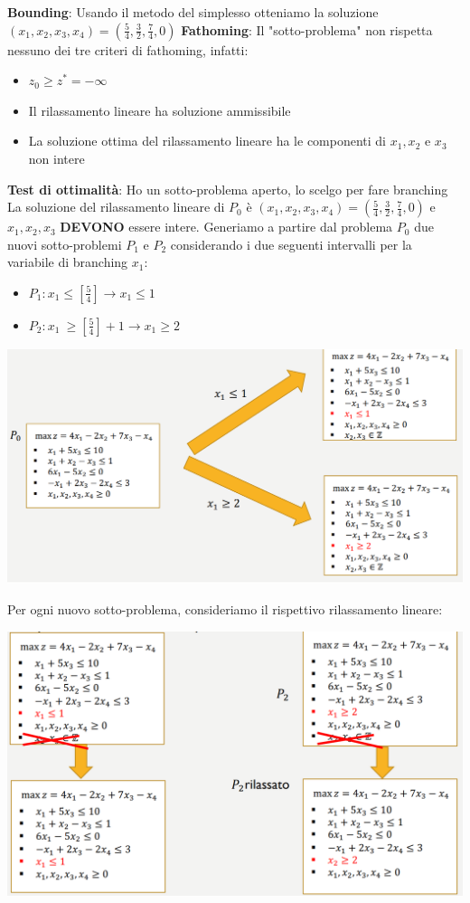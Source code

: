 \documentclass[12pt]{article}
\begin{document}
\textbf{Bounding}: Usando il metodo del simplesso otteniamo la soluzione $(x_1,x_2,x_3,x_4) = (\frac{5}{4}, \frac{3}{2}, \frac{7}{4}, 0)$ \newline
\textbf{Fathoming}: Il "sotto-problema" non rispetta nessuno dei tre criteri di fathoming, infatti:
\begin{itemize}
    \item $z_0 \geq z^* = -\infty$
    \item Il rilassamento lineare ha soluzione ammissibile
    \item La soluzione ottima del rilassamento lineare ha le componenti di $x_1, x_2$ e $x_3$ non intere
\end{itemize}
\textbf{Test di ottimalità}: Ho un sotto-problema aperto, lo scelgo per fare branching \newline
La soluzione del rilassamento lineare di $P_0$ è $(x_1, x_2, x_3, x_4) = (\frac{5}{4}, \frac{3}{2}, \frac{7}{4}, 0)$ e $x_1,x_2,x_3$ \textbf{DEVONO} essere intere.
Generiamo a partire dal problema $P_0$ due nuovi sotto-problemi $P_1$ e $P_2$ considerando i due seguenti intervalli per la variabile di branching $x_1$:
\begin{itemize}
    \item $P_1: x_1 \leq \left [\frac{5}{4}\right ] \rightarrow x_1 \leq 1$
    \item $P_2: x_1\ \geq \left [\frac{5}{4} \right ] + 1 \rightarrow x_1 \geq 2$
\end{itemize}
\begin{center}
    \includegraphics[width = 1\linewidth]{Images/74.png}
\end{center}
Per ogni nuovo sotto-problema, consideriamo il rispettivo rilassamento lineare:
\begin{center}
    \includegraphics[width = 1\linewidth]{Images/75.png}
\end{center}
\end{document}
